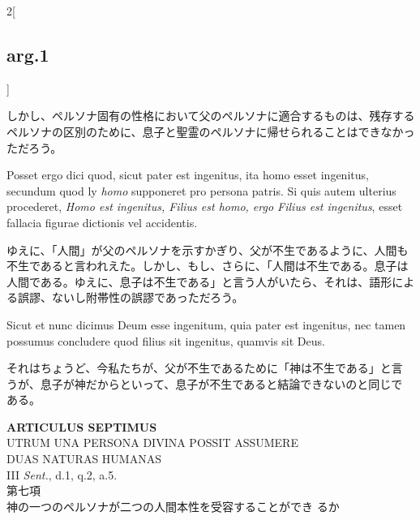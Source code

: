\documentclass[paper=a4paper,fontsize=10pt,jafontsize=9pt,titlepage]{jlreq}
\begin{document}
\begin{paracol}{2}[\subsection{arg.1}]
\switchcolumn

しかし、ペルソナ固有の性格において父のペルソナに適合するものは、残存する
 ペルソナの区別のために、息子と聖霊のペルソナに帰せられることはできなかっ
 ただろう。

\switchcolumn*

Posset ergo dici quod, sicut
pater est ingenitus, ita homo esset ingenitus, secundum quod ly {\itshape homo}
supponeret pro persona patris. Si quis autem ulterius procederet, {\itshape Homo
est ingenitus, Filius est homo, ergo Filius est ingenitus}, esset
fallacia figurae dictionis vel accidentis.

\switchcolumn

ゆえに、「人間」が父のペルソナを示すかぎり、父が不生であるように、人間も
 不生であると言われえた。しかし、もし、さらに、「人間は不生である。息子は
 人間である。ゆえに、息子は不生である」と言う人がいたら、それは、語形によ
 る誤謬、ないし附帯性の誤謬であっただろう。

\switchcolumn*

Sicut et nunc dicimus Deum
esse ingenitum, quia pater est ingenitus, nec tamen possumus concludere
quod filius sit ingenitus, quamvis sit Deus.

\switchcolumn

それはちょうど、今私たちが、父が不生であるために「神は不生である」と言
 うが、息子が神だからといって、息子が不生であると結論できないのと同じで
 ある。

\end{paracol}
\newpage
{}
{}
\setcounter{section}{7}
\setcounter{subsection}{0}



\begin{center}
 {\Large {\bfseries ARTICULUS SEPTIMUS}}\\
 {\large UTRUM UNA PERSONA DIVINA POSSIT ASSUMERE\\ DUAS NATURAS HUMANAS}\\
 {\footnotesize III {\itshape Sent.}, d.1, q.2, a.5.}\\
 {\Large 第七項\\神の一つのペルソナが二つの人間本性を受容することができ
 るか}
\end{center}
\end{document}
